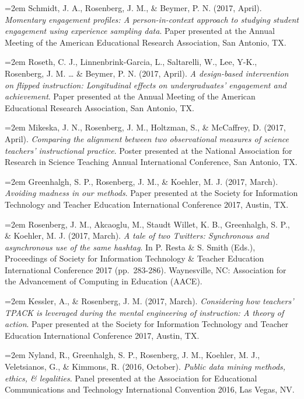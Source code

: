 \documentclass[
  14,
]{article}
\begin{document}
\hangindent=2em Schmidt, J. A., Rosenberg, J. M., \& Beymer, P. N.
(2017, April). \emph{Momentary engagement profiles: A person-in-context
approach to studying student engagement using experience sampling data}.
Paper presented at the Annual Meeting of the American Educational
Research Association, San Antonio, TX.

\hangindent=2em Roseth, C. J., Linnenbrink-Garcia, L., Saltarelli, W.,
Lee, Y-K., Rosenberg, J. M. \ldots{} \& Beymer, P. N. (2017, April).
\emph{A design-based intervention on flipped instruction: Longitudinal
effects on undergraduates' engagement and achievement}. Paper presented
at the Annual Meeting of the American Educational Research Association,
San Antonio, TX.

\hangindent=2em Mikeska, J. N., Rosenberg, J. M., Holtzman, S., \&
McCaffrey, D. (2017, April). \emph{Comparing the alignment between two
observational measures of science teachers' instructional practice}.
Poster presented at the National Association for Research in Science
Teaching Annual International Conference, San Antonio, TX.

\hangindent=2em Greenhalgh, S. P., Rosenberg, J. M., \& Koehler, M. J.
(2017, March). \emph{Avoiding madness in our methods}. Paper presented
at the Society for Information Technology and Teacher Education
International Conference 2017, Austin, TX.

\hangindent=2em Rosenberg, J. M., Akcaoglu, M., Staudt Willet, K. B.,
Greenhalgh, S. P., \& Koehler, M. J. (2017, March). \emph{A tale of two
Twitters: Synchronous and asynchronous use of the same hashtag}. In P.
Resta \& S. Smith (Eds.), Proceedings of Society for Information
Technology \& Teacher Education International Conference 2017
(pp.~283-286). Waynesville, NC: Association for the Advancement of
Computing in Education (AACE).

\hangindent=2em Kessler, A., \& Rosenberg, J. M. (2017, March).
\emph{Considering how teachers' TPACK is leveraged during the mental
engineering of instruction: A theory of action}. Paper presented at the
Society for Information Technology and Teacher Education International
Conference 2017, Austin, TX.

\hangindent=2em Nyland, R., Greenhalgh, S. P., Rosenberg, J. M.,
Koehler, M. J., Veletsianos, G., \& Kimmons, R. (2016, October).
\emph{Public data mining methods, ethics, \& legalities}. Panel
presented at the Association for Educational Communications and
Technology International Convention 2016, Las Vegas, NV.
\end{document}
